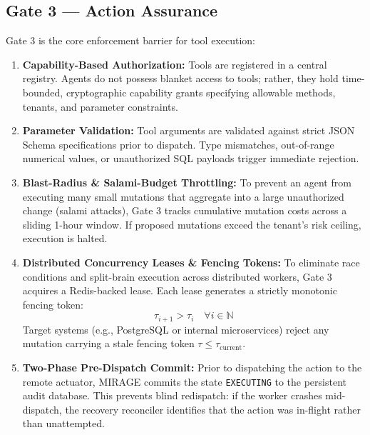 \documentclass[11pt,a4paper]{article}
\begin{document}
\subsection{Gate 3 — Action Assurance}
Gate 3 is the core enforcement barrier for tool execution:
\begin{enumerate}[leftmargin=*,itemsep=2pt]
  \item \textbf{Capability-Based Authorization:} Tools are registered in a central registry. Agents do not possess blanket access to tools; rather, they hold time-bounded, cryptographic capability grants specifying allowable methods, tenants, and parameter constraints.
  \item \textbf{Parameter Validation:} Tool arguments are validated against strict JSON Schema specifications prior to dispatch. Type mismatches, out-of-range numerical values, or unauthorized SQL payloads trigger immediate rejection.
  \item \textbf{Blast-Radius \& Salami-Budget Throttling:} To prevent an agent from executing many small mutations that aggregate into a large unauthorized change (salami attacks), Gate 3 tracks cumulative mutation costs across a sliding 1-hour window. If proposed mutations exceed the tenant's risk ceiling, execution is halted.
  \item \textbf{Distributed Concurrency Leases \& Fencing Tokens:} To eliminate race conditions and split-brain execution across distributed workers, Gate 3 acquires a Redis-backed lease. Each lease generates a strictly monotonic fencing token:
  \begin{equation}
    \tau_{i+1} > \tau_i \quad \forall i \in \mathbb{N}
  \end{equation}
  Target systems (e.g., PostgreSQL or internal microservices) reject any mutation carrying a stale fencing token $\tau \le \tau_{\text{current}}$.
  \item \textbf{Two-Phase Pre-Dispatch Commit:} Prior to dispatching the action to the remote actuator, MIRAGE commits the state \texttt{EXECUTING} to the persistent audit database. This prevents blind redispatch: if the worker crashes mid-dispatch, the recovery reconciler identifies that the action was in-flight rather than unattempted.
\end{enumerate}
\end{document}

